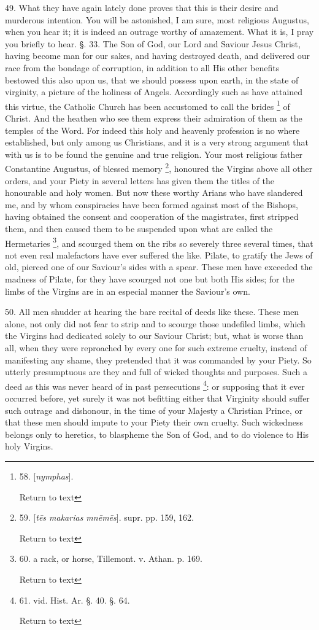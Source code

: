 49. What they have again lately done proves that this is their desire
and murderous intention. You will be astonished, I am sure, most
religious Augustus, when you hear it; it is indeed an outrage worthy
of amazement. What it is, I pray you briefly to hear. §. 33. The Son
of God, our Lord and Saviour Jesus Christ, having become man for our
sakes, and having destroyed death, and delivered our race from the
bondage of corruption, in addition to all His other benefits bestowed
this also upon us, that we should possess upon earth, in the state of
virginity, a picture of the holiness of Angels. Accordingly such as
have attained this virtue, the Catholic Church has been accustomed to
call the brides \footnote{58. [\emph{n}\emph{y}\emph{mphas}].

Return to text} of
Christ. And the heathen who see them express their admiration of them
as the temples of the Word. For indeed this holy and heavenly
profession is no where established, but only among us Christians, and
it is a very strong argument that with us is to be found the genuine
and true religion. Your most religious father Constantine Augustus, of
blessed memory \footnote{59. [\emph{t\={e}s
makarias mn\={e}m\={e}s}].
supr. pp. 159, 162.

Return to text},
honoured the Virgins above all other orders, and your Piety in several
letters has given them the titles of the honourable and holy women.
But now these worthy Arians who have slandered me, and by whom
conspiracies have been formed against most of the Bishops, having
obtained the consent and cooperation of the magistrates, first
stripped them, and then caused them to be suspended upon what are
called the Hermetaries \footnote{60. a rack, or horse, Tillemont. v. Athan. p. 169.

Return to text},
and scourged them on the ribs so severely three several times, that
not even real malefactors have ever suffered the like. Pilate, to
gratify the Jews of old, pierced one of our Saviour's sides with a
spear. These men have exceeded the madness of Pilate, for they have
scourged not one but both His sides; for the limbs of the Virgins are
in an especial manner the Saviour's own.

50. All men shudder at hearing the bare recital of deeds like these.
These men alone, not only did not fear to strip and to scourge those
undefiled limbs, which the Virgins had dedicated solely to our Saviour
Christ; but, what is worse than all, when they were reproached by
every one for such extreme cruelty, instead of manifesting any shame,
they pretended that it was commanded by your Piety. So utterly
presumptuous are they and full of wicked thoughts and purposes. Such a
deed as this was never heard of in past persecutions \footnote{61. vid. Hist. Ar. §. 40. §. 64.

Return to text}: or supposing that it ever occurred before, yet surely it was
not befitting either that Virginity should suffer such outrage and
dishonour, in the time of your Majesty a Christian Prince, or that
these men should impute to your Piety their own cruelty. Such
wickedness belongs only to heretics, to blaspheme the Son of God, and
to do violence to His holy Virgins.

